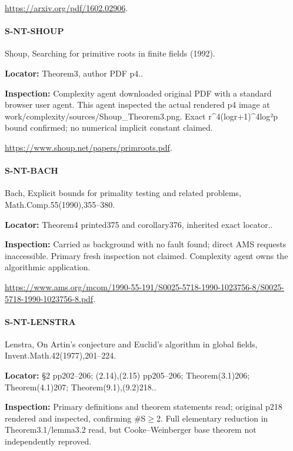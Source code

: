 \documentclass[11pt,a4paper]{article}
\begin{document}
\url{https://arxiv.org/pdf/1602.02906}.

\paragraph{S-NT-SHOUP} Shoup, Searching for primitive roots in finite fields (1992).

\textbf{Locator:} Theorem3, author PDF p4.\allowbreak{}.

\textbf{Inspection:} Complexity agent downloaded original PDF with a standard browser user agent.\allowbreak{} This agent inspected the actual rendered p4 image at work/\allowbreak{}complexity/\allowbreak{}sources/\allowbreak{}Shoup\_\allowbreak{}Theorem3.\allowbreak{}png.\allowbreak{} Exact r\textasciicircum{}4(logr+1)\textasciicircum{}4log²p bound confirmed; no numerical implicit constant claimed.\allowbreak{}

\url{https://www.shoup.net/papers/primroots.pdf}.

\paragraph{S-NT-BACH} Bach, Explicit bounds for primality testing and related problems, Math.\allowbreak{}Comp.\allowbreak{}55(1990),355–\allowbreak{}380.

\textbf{Locator:} Theorem4 printed375 and corollary376, inherited exact locator.\allowbreak{}.

\textbf{Inspection:} Carried as background with no fault found; direct AMS requests inaccessible.\allowbreak{} Primary fresh inspection not claimed.\allowbreak{} Complexity agent owns the algorithmic application.\allowbreak{}

\url{https://www.ams.org/mcom/1990-55-191/S0025-5718-1990-1023756-8/S0025-5718-1990-1023756-8.pdf}.

\paragraph{S-NT-LENSTRA} Lenstra, On Artin’s conjecture and Euclid’s algorithm in global fields, Invent.\allowbreak{}Math.\allowbreak{}42(1977),201–\allowbreak{}224.

\textbf{Locator:} §2 pp202–\allowbreak{}206; (2.\allowbreak{}14),(2.\allowbreak{}15) pp205–\allowbreak{}206; Theorem(3.\allowbreak{}1)206; Theorem(4.\allowbreak{}1)207; Theorem(9.\allowbreak{}1),(9.\allowbreak{}2)218.\allowbreak{}.

\textbf{Inspection:} Primary definitions and theorem statements read; original p218 rendered and inspected, confirming \#S\ensuremath{\ge}2.\allowbreak{} Full elementary reduction in Theorem3.\allowbreak{}1/\allowbreak{}lemma3.\allowbreak{}2 read, but Cooke–\allowbreak{}Weinberger base theorem not independently reproved.\allowbreak{}
\end{document}

